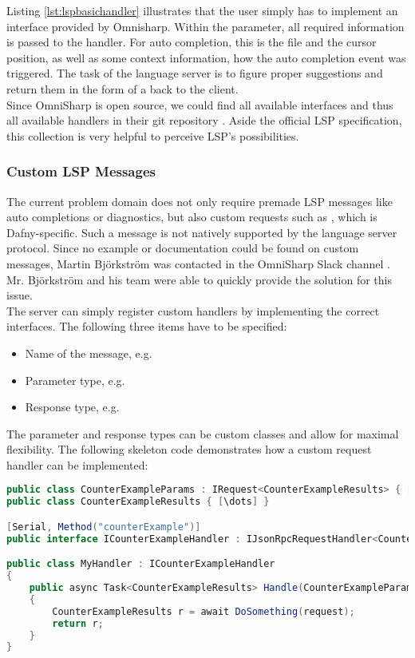 Listing \ref{lst:lspbasichandler} illustrates that the user simply has to implement an interface provided by Omnisharp.
Within the  parameter, all required information is passed to the handler.
For auto completion, this is the file and the cursor position, as well as some context information, how the auto completion event was triggered.
The task of the language server is to figure proper suggestions and return them in the form of a  back to the client.\\

Since OmniSharp is open source, we could find all available interfaces and thus all available handlers in their git repository \cite{omnisharpgit}.
Aside the official LSP specification, this collection is very helpful to perceive LSP's possibilities.

\subsubsection{Custom LSP Messages}
\label{chapter:customlspmsg}
The current problem domain does not only require premade LSP messages like auto completions or diagnostics, but also custom requests such as , which is Dafny-specific.
Such a message is not natively supported by the language server protocol.
Since no example or documentation could be found on custom messages, Martin Bj\"orkstr\"om was contacted in the OmniSharp Slack channel \cite{omnisharpslack}.
Mr. Bj\"orkstr\"om and his team were able to quickly provide the solution for this issue.\\

The server can simply register custom handlers by implementing the correct interfaces.
The following three items have to be specified:
\begin{itemize}
    \item Name of the message, e.g. 
    \item Parameter type, e.g. 
    \item Response type, e.g. 
\end{itemize}


The parameter and response types can be custom classes and allow for maximal flexibility. 
The following skeleton code demonstrates how a custom request handler can be implemented:

\begin{lstlisting}[language=csharp, caption={LSP Handler Implementation}, captionpos=b, label={lst:lspcustomhandler}]
public class CounterExampleParams : IRequest<CounterExampleResults> { [\dots] }
public class CounterExampleResults { [\dots] }

[Serial, Method("counterExample")]
public interface ICounterExampleHandler : IJsonRpcRequestHandler<CounterExampleParams, CounterExampleResults> { }

public class MyHandler : ICounterExampleHandler
{
    public async Task<CounterExampleResults> Handle(CounterExampleParams request, CancellationToken c)
    {
        CounterExampleResults r = await DoSomething(request);
        return r;
    }
}
\end{lstlisting}


